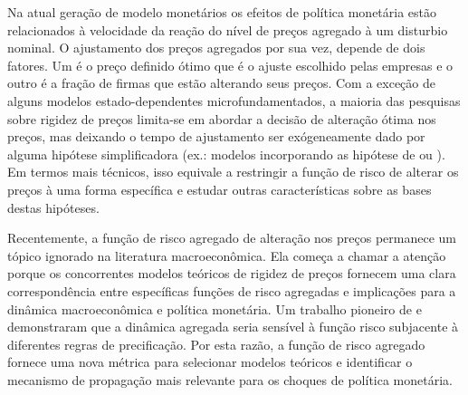 \documentclass[twoside,a4paper,11pt]{report}
\begin{document}
Na atual geração de modelo monetários os efeitos de política monetária estão relacionados à velocidade da reação do nível de preços agregado à um disturbio nominal. O ajustamento dos preços agregados por sua vez, depende de dois fatores. Um é o preço definido ótimo que é o ajuste escolhido pelas empresas e o outro é a fração de firmas que estão alterando seus preços. Com a exceção de alguns modelos estado-dependentes microfundamentados, a maioria das pesquisas sobre rigidez de preços limita-se em abordar a decisão de alteração ótima nos preços, mas deixando o tempo de ajustamento ser exógeneamente dado por alguma hipótese simplificadora (ex.: modelos incorporando as hipótese de \citet{taylor1980aggregate} ou \citet{calvo1983staggered}). Em termos mais técnicos, isso equivale a restringir a função de risco de alterar os preços à uma forma específica e estudar outras características sobre as bases destas hipóteses. 

Recentemente, a função de risco agregado de alteração nos preços permanece um tópico ignorado na literatura macroeconômica. Ela começa a chamar a atenção porque os concorrentes modelos teóricos de rigidez de preços fornecem uma clara correspondência entre específicas funções de risco agregadas e implicações para a dinâmica macroeconômica e política monetária. Um trabalho pioneiro de \citet{wolman1999} e \citet{kiley2002partial} demonstraram que a dinâmica agregada seria sensível à função risco subjacente à diferentes regras de precificação. Por esta razão, a função de risco agregado fornece uma nova métrica para selecionar modelos teóricos e identificar o mecanismo de propagação mais relevante para os choques de política monetária. 
\end{document}

